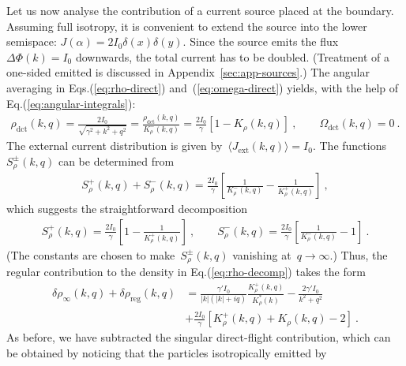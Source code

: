 \documentclass[preprint,aps,eqsecnum, prb]{revtex4-1}
\newcommand{\fplus}[1]{{#1}^{+}}
\newcommand{\fminus}[1]{{#1}^{-}}
\newcommand{\fplusminus}[1]{{#1}^{\pm}}
\newcommand{\dct}[1]{{#1}_\mathrm{dct}}
\begin{document}
Let us now analyse the contribution of a current source placed at the boundary.
Assuming full isotropy, it is convenient to
extend the source into the lower semispace:
$J(\alpha) = 2I_0 \delta(x) \delta(y)$. Since the source
emits the flux~$\Delta \Phi(k) = I_0$ downwards, the total
current has to be doubled.
(Treatment of a one-sided emitted is discussed in Appendix~\ref{sec:app-sources}.)
The angular averaging in Eqs.(\ref{eq:rho-direct}) and~(\ref{eq:omega-direct})
yields, with the help of Eq.(\ref{eq:angular-integrals}):
\begin{align}
  \label{eq:I-src-rho-omega}
  \dct{\rho}(k, q) = \frac{2I_0}{\sqrt{\gamma^2 + k^2 + q^2}} =
  \frac{\dct{\rho}(k, q)}{\fminus{K}_\rho(k, q)} =
  \frac{2I_0}{\gamma} \left[1 - K_\rho(k, q)\right]\ ,
  \qquad
  \dct{\Omega}(k, q) = 0\ .
\end{align}
The external current distribution is
given by~$\langle J_\mathrm{ext}(k, q) \rangle = I_0$.
The functions~$\fplusminus{S}_\rho(k, q)$ can be determined from
\begin{align}
    \fplus{S}_\rho(k, q)
 +  \fminus{S}_\rho(k, q)
  = \frac{2I_0}{\gamma} \left[\frac{1}{\fminus{K}_\rho(k, q)}
  - \frac{1}{\fplus{K}_\rho(k, q)}\right]\ ,
\end{align}
which suggests the straightforward decomposition
\begin{align}
  \label{eq:iso-chi}
  \fplus{S}_\rho(k, q) = \frac{2I_0}{\gamma}
  \left[1 - \frac{1}{\fplus{K}_\rho(k, q)}\right]\ ,
  \qquad
  \fminus{S}_\rho(k, q) = \frac{2I_0}{\gamma}
  \left[\frac{1}{\fminus{K}_\rho(k, q)} - 1\right]\ .
\end{align}
(The constants are chosen to make~$\fplusminus{S}_\rho(k, q)$
vanishing at~$q\to\infty$.) Thus, the regular contribution
to the density in Eq.(\ref{eq:rho-decomp}) takes the form
\begin{align}
  \label{eq:iso-rho-reg}
  \delta\rho_\infty(k, q) + \delta\rho_\mathrm{reg}(k, q) &=
  \frac{\gamma' I_0}{|k|(|k| + iq)} \frac{\fplus{K}_\rho(k, q)}{
  K^\ast_{\rho}(k)}
  - \frac{2\gamma' I_0}{k^2 + q^2} \\ \nonumber
   & + \frac{2I_0}{\gamma}
     \left[\fplus{K}_\rho(k, q) + K_\rho(k, q) - 2\right] \ .
\end{align}
As before, we have subtracted the singular direct-flight contribution,
which can be obtained by noticing that the particles isotropically emitted by
\end{document}
